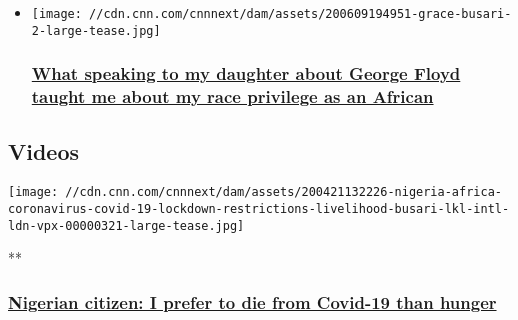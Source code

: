 \begin{itemize}
\item
  \href{/2020/06/10/africa/stephanie-busari-george-floyd-race-privilege-africa/index.html}{}

  \texttt{[image: //cdn.cnn.com/cnnnext/dam/assets/200609194951-grace-busari-2-large-tease.jpg]}

  \hypertarget{what-speaking-to-my-daughter-about-george-floyd-taught-me-about-my-race-privilege-as-an-african}{%
  \subsubsection{\texorpdfstring{\href{/2020/06/10/africa/stephanie-busari-george-floyd-race-privilege-africa/index.html}{What
  speaking to my daughter about George Floyd taught me about my race
  privilege as an
  African}}{What speaking to my daughter about George Floyd taught me about my race privilege as an African}}\label{what-speaking-to-my-daughter-about-george-floyd-taught-me-about-my-race-privilege-as-an-african}}
\end{itemize}

\hypertarget{videos-}{%
\subsection{Videos~}\label{videos-}}

\href{/videos/world/2020/04/21/nigeria-africa-coronavirus-covid-19-lockdown-restrictions-livelihood-busari-lkl-intl-ldn-vpx.cnn}{}

\texttt{[image: //cdn.cnn.com/cnnnext/dam/assets/200421132226-nigeria-africa-coronavirus-covid-19-lockdown-restrictions-livelihood-busari-lkl-intl-ldn-vpx-00000321-large-tease.jpg]}

**

\hypertarget{nigerian-citizen-i-prefer-to-die-from-covid-19-than-hunger}{%
\subsubsection{\texorpdfstring{\href{/videos/world/2020/04/21/nigeria-africa-coronavirus-covid-19-lockdown-restrictions-livelihood-busari-lkl-intl-ldn-vpx.cnn}{Nigerian
citizen: I prefer to die from Covid-19 than
hunger}}{Nigerian citizen: I prefer to die from Covid-19 than hunger}}\label{nigerian-citizen-i-prefer-to-die-from-covid-19-than-hunger}}

\href{/videos/world/2020/04/29/south-africa-coronavirus-covid-19-pandemic-hiv-aids-lessons-mckenzie-pkg-intl-ldn-vpx.cnn}{}


